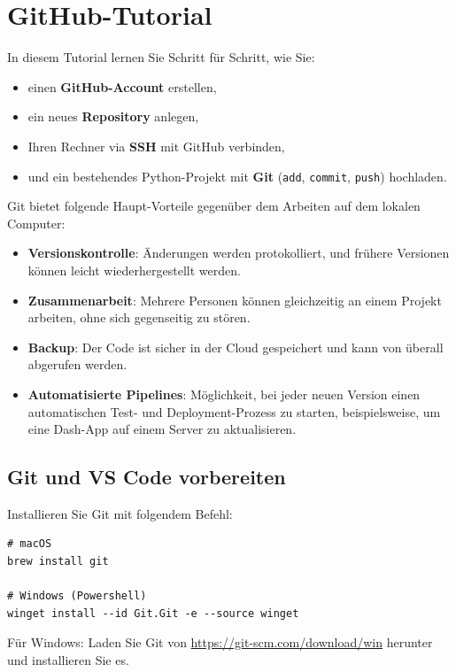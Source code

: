 \chapter{GitHub-Tutorial}\label{ch:GitHub}

In diesem Tutorial lernen Sie Schritt für Schritt, wie Sie:
\begin{itemize}
  \item einen \textbf{GitHub-Account} erstellen,
  \item ein neues \textbf{Repository} anlegen,
  \item Ihren Rechner via \textbf{SSH} mit GitHub verbinden,
  \item und ein bestehendes Python-Projekt mit \textbf{Git} (\lstinline|add|, \lstinline|commit|, \lstinline|push|) hochladen.
\end{itemize}

Git bietet folgende Haupt-Vorteile gegenüber dem Arbeiten auf dem lokalen Computer:
\begin{itemize}
  \item \textbf{Versionskontrolle}: Änderungen werden protokolliert, und frühere Versionen können leicht wiederhergestellt werden.
  \item \textbf{Zusammenarbeit}: Mehrere Personen können gleichzeitig an einem Projekt arbeiten, ohne sich gegenseitig zu stören.
  \item \textbf{Backup}: Der Code ist sicher in der Cloud gespeichert und kann von überall abgerufen werden.
  \item \textbf{Automatisierte Pipelines}: Möglichkeit, bei jeder neuen Version einen automatischen Test- und Deployment-Prozess zu starten, beispielsweise, um eine Dash-App auf einem Server zu aktualisieren.
\end{itemize}

\section*{Git und VS Code vorbereiten}
Installieren Sie Git mit folgendem Befehl:

\begin{lstlisting}[style=bash]
# macOS
brew install git

# Windows (Powershell)
winget install --id Git.Git -e --source winget
\end{lstlisting}

Für Windows: Laden Sie Git von \url{https://git-scm.com/download/win} herunter und installieren Sie es.

